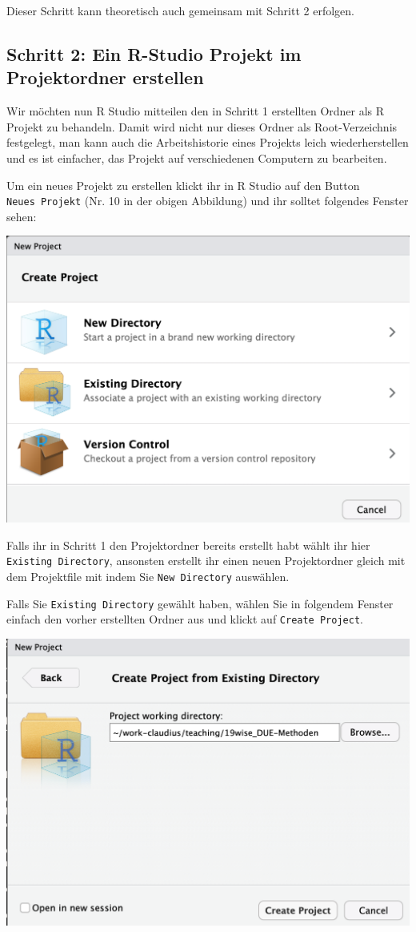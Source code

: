 \documentclass[]{book}
\begin{document}
Dieser Schritt kann theoretisch auch gemeinsam mit Schritt 2 erfolgen.

\subsection{Schritt 2: Ein R-Studio Projekt im Projektordner
erstellen}\label{schritt-2-ein-r-studio-projekt-im-projektordner-erstellen}

Wir möchten nun R Studio mitteilen den in Schritt 1 erstellten Ordner
als R Projekt zu behandeln. Damit wird nicht nur dieses Ordner als
Root-Verzeichnis festgelegt, man kann auch die Arbeitshistorie eines
Projekts leich wiederherstellen und es ist einfacher, das Projekt auf
verschiedenen Computern zu bearbeiten.

Um ein neues Projekt zu erstellen klickt ihr in R Studio auf den Button
\texttt{Neues\ Projekt} (Nr. 10 in der obigen Abbildung) und ihr solltet
folgendes Fenster sehen:

\begin{center}\includegraphics[width=0.6\linewidth]{figures/r-studio-new-project} \end{center}

Falls ihr in Schritt 1 den Projektordner bereits erstellt habt wählt ihr
hier \texttt{Existing\ Directory}, ansonsten erstellt ihr einen neuen
Projektordner gleich mit dem Projektfile mit indem Sie
\texttt{New\ Directory} auswählen.

Falls Sie \texttt{Existing\ Directory} gewählt haben, wählen Sie in
folgendem Fenster einfach den vorher erstellten Ordner aus und klickt
auf \texttt{Create\ Project}.

\begin{center}\includegraphics[width=0.6\linewidth]{figures/r-studio-new-project-exis-dir} \end{center}
\end{document}
